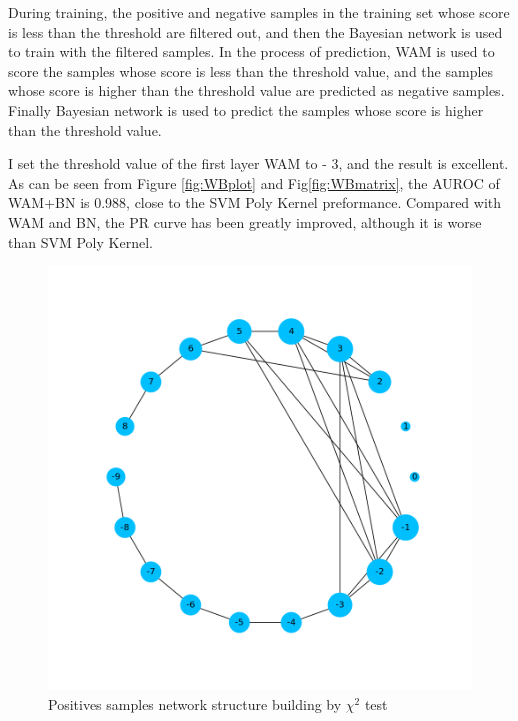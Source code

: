 \documentclass{gapd}
\begin{document}
During training, the positive and negative samples in the training set
whose score is less than the threshold are filtered out, and then the
Bayesian network is used to train with the filtered samples. In the
process of prediction, WAM is used to score the samples whose score is
less than the threshold value, and the samples whose score is higher
than the threshold value are predicted as negative samples. Finally
Bayesian network is used to predict the samples whose score is higher
than the threshold value.

I set the threshold value of the first layer WAM to - 3, and the result
is excellent. As can be seen from Figure \ref{fig:WBplot} and Fig\ref{fig:WBmatrix}, the AUROC of WAM+BN
is 0.988, close to the SVM Poly Kernel preformance. Compared with WAM
and BN, the PR curve has been greatly improved, although it is worse
than SVM Poly Kernel.

\begin{figure}
  \centering
  \includegraphics[width=0.85\columnwidth]{assets/image-20210624165031819.png}
  \caption{Positives samples network structure building by \(\chi^2\) test}
  \label{fig:positive}
\end{figure}
  
\end{document}
